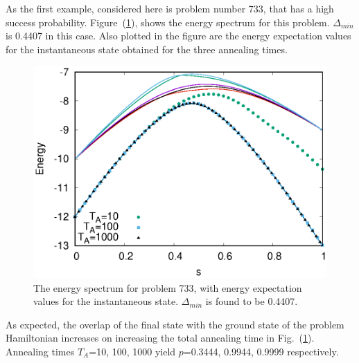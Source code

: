 \documentclass[../main.tex]{subfiles}
\begin{document}
As the first example, considered here is problem number 733, that has a high success probability. Figure~(\ref{fig:o2}), shows the energy spectrum for this problem. $\Delta_{min}$ is 0.4407 in this case. Also plotted in the figure are the energy expectation values for the instantaneous state obtained for the three annealing times.
\begin{figure}[H]
\centering 
\includegraphics[scale=0.8]{733_s12_O.eps}
\caption{The energy spectrum for problem 733, with energy expectation values for the instantaneous state. $\Delta_{min}$ is found to be 0.4407.}
\label{fig:o2}
\end{figure}

As expected, the overlap of the final state with the ground state of the problem Hamiltonian increases on increasing the total annealing time in Fig.~(\ref{fig:o2}). Annealing times $T_A$=10, 100, 1000 yield $p$=0.3444, 0.9944, 0.9999 respectively.\\
\end{document}
